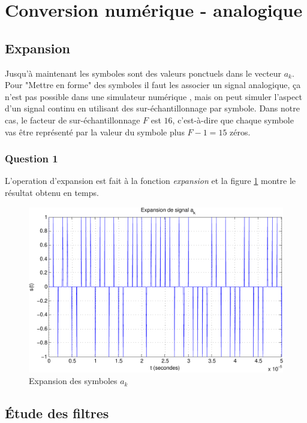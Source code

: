 \documentclass[a4paper,11pt]{article}
\begin{document}
\section{Conversion numérique - analogique}

\subsection{Expansion}
Jusqu'à maintenant les symboles sont des valeurs ponctuels dans le vecteur $a_k$. Pour "Mettre en forme" des symboles il faut les associer un signal analogique, ça n'est pas possible dans une simulateur numérique , mais on peut simuler l'aspect d'un signal continu en utilisant des sur-échantillonnage par symbole. Dans notre cas, le facteur de sur-échantillonnage $F$ est $16$, c'est-à-dire que chaque symbole vas être représenté par la valeur du symbole plus $F-1=15$ zéros.

\subsubsection*{Question 1}
L'operation d'expansion est fait à la fonction \emph{expansion} et la figure \ref{fig:ques1} montre le résultat obtenu  en temps.

\begin{figure}
	\begin{center}
	\includegraphics[scale=1]{expansion-crop.pdf}
	\caption{Expansion des symboles $a_k$}
	\label{fig:ques1}
	\end{center}
\end{figure} 

\subsection{Étude des filtres}
\end{document}

